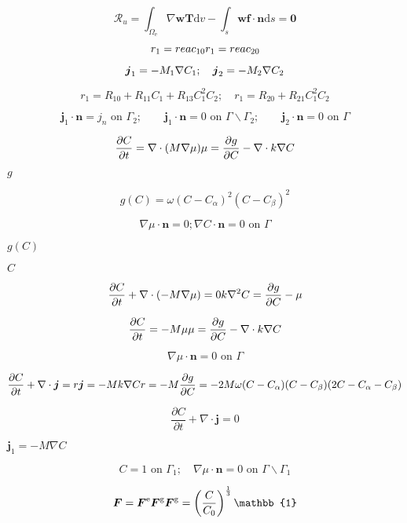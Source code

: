 \documentclass{article}
\begin{document}
\[ \mathscr{R}_u=\int_{\Omega_{\text{e}}}\nabla \boldsymbol{w}\boldsymbol{T} \text{d}v- \int_{s}\boldsymbol{w} \boldsymbol{f} \cdot \boldsymbol{n} \text{d}s = \boldsymbol{0} \]
\pagebreak

\[ r_1= reac_{10} \\ r_1= reac_{20} \]
\pagebreak

\[ \boldsymbol{j}_1=-M_1\nabla C_\text{1}; \quad \boldsymbol{j}_2=-M_2\nabla C_\text{2}\\ \]
\pagebreak

\[ r_1= R_{10}+R_{11}C_1+R_{13}C_1^2C_2; \quad r_1= R_{20}+R_{21}C_1^2C_2 \]
\pagebreak

\[ \boldsymbol{j}_1\cdot\boldsymbol{n}=j_n \text{ on }\Gamma_2;\quad \quad \boldsymbol{j}_1\cdot\boldsymbol{n}=0 \text{ on }\Gamma \backslash \Gamma_2; \quad \quad \boldsymbol{j}_2\cdot\boldsymbol{n}=0 \text{ on }\Gamma \]
\pagebreak

\[ \frac{\partial C}{\partial t}=\nabla\cdot(M\nabla\mu)\\ \mu=\frac{\partial g}{\partial C}-\nabla\cdot k\nabla C \]
\pagebreak

$g$
\pagebreak

\[ g(C)=\omega(C-C_\alpha)^2(C-C_\beta)^2 \]
\pagebreak

\[ \nabla\mu\cdot\boldsymbol{n}=0; \nabla C\cdot\boldsymbol{n}=0 \text{ on }\Gamma \]
\pagebreak

$g(C)$
\pagebreak

$C$
\pagebreak

\[ \frac{\partial C}{\partial t}+\nabla\cdot(-M\nabla\mu)=0\\ k\nabla^2 C=\frac{\partial g}{\partial C}-\mu \]
\pagebreak

\[ \frac{\partial C}{\partial t}=-M\mu\\ \mu=\frac{\partial g}{\partial C}-\nabla\cdot k\nabla C \]
\pagebreak

\[ \nabla \mu\cdot\boldsymbol{n}=0 \text{ on }\Gamma \]
\pagebreak

\[ \frac{\partial C}{\partial t}+\nabla\cdot\boldsymbol{j}=r\\ \boldsymbol{j}=-Mk\nabla C\\ r=-M\frac{\partial g}{\partial C}=-2M\omega(C-C_\alpha)(C-C_\beta)(2C-C_\alpha-C_\beta) \]
\pagebreak

\[ \frac{\partial C}{\partial t}+\nabla\cdot\boldsymbol{j}=0 \]
\pagebreak

$\boldsymbol{j}_1=-M\nabla C$
\pagebreak

\[ C=1 \text{ on }\Gamma_1; \quad \nabla \mu\cdot\boldsymbol{n}=0 \text{ on }\Gamma \backslash \Gamma_1 \]
\pagebreak

\[ \boldsymbol{F}=\boldsymbol{F}^{\text{e}}\boldsymbol{F}^{\text{g}}\\ \boldsymbol{F}^{\text{g}}=\left(\frac{C}{C_\text{0}}\right)^{\frac{1}{3}}\mathbb{1} \]
\pagebreak
\end{document}
